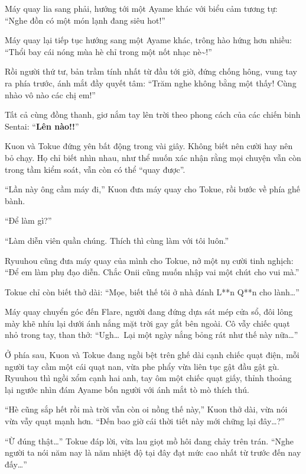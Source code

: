 \documentclass[../main.tex]{subfiles}
\begin{document}
Máy quay lia sang phải, hướng tới một Ayame khác với biểu cảm tương tự: ``Nghe đồn có một món lạnh đang siêu hot!''

Máy quay lại tiếp tục hướng sang một Ayame khác, trông hào hứng hơn nhiều: ``Thổi bay cái nóng mùa hè chỉ trong một nốt nhạc nè\~{}!''


Rồi người thứ tư, bản trầm tính nhất từ đầu tới giờ, đứng chống hông, vung tay ra phía trước, ánh mắt đầy quyết tâm: ``Trăm nghe không bằng một thấy! Cùng nhào vô nào các chị em!''

Tất cả cùng đồng thanh, giơ nắm tay lên trời theo phong cách của các chiến binh Sentai: ``\textbf{Lên nào!!}''


Kuon và Tokue đứng yên bất động trong vài giây. Không biết nên cười hay nên bỏ chạy. Họ chỉ biết nhìn nhau, như thể muốn xác nhận rằng mọi chuyện vẫn còn trong tầm kiểm soát, vẫn còn có thể ``quay được''.

``Lần này ông cầm máy đi,'' Kuon đưa máy quay cho Tokue, rồi bước về phía ghế bành.

``Để làm gì?''

``Làm diễn viên quần chúng. Thích thì cùng làm với tôi luôn.''

Ryuuhou cũng đưa máy quay của mình cho Tokue, nở một nụ cười tinh nghịch: ``Để em làm phụ đạo diễn. Chắc Onii cũng muốn nhập vai một chút cho vui mà.''

Tokue chỉ còn biết thở dài: ``Mọe, biết thế tôi ở nhà đánh L**n Q**n cho lành\dots''

\ct

Máy quay chuyển góc đến Flare, người đang đứng dựa sát mép cửa sổ, đôi lông mày khẽ nhíu lại dưới ánh nắng mặt trời gay gắt bên ngoài. Cô vẫy chiếc quạt nhỏ trong tay, than thở: ``Ugh\dots\ Lại một ngày nắng bỏng rát như thế này nữa\dots''

Ở phía sau, Kuon và Tokue đang ngồi bệt trên ghế dài cạnh chiếc quạt điện, mỗi người tay cầm một cái quạt nan, vừa phe phẩy vừa liên tục gật đầu gật gù. Ryuuhou thì ngồi xổm cạnh hai anh, tay ôm một chiếc quạt giấy, thỉnh thoảng lại ngước nhìn đám Ayame bốn người với ánh mắt tò mò thích thú.

``Hè cũng sắp hết rồi mà trời vẫn còn oi nồng thế này,'' Kuon thở dài, vừa nói vừa vẫy quạt mạnh hơn. ``Đến bao giờ cái thời tiết này mới chững lại đây\dots?''

``Ừ đúng thật\dots'' Tokue đáp lời, vừa lau giọt mồ hôi đang chảy trên trán. ``Nghe người ta nói năm nay là năm nhiệt độ tại đây đạt mức cao nhất từ trước đến nay đấy\dots''
\end{document}
